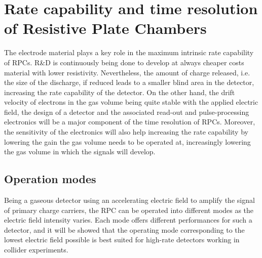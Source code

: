 \section{Rate capability and time resolution of Resistive Plate Chambers}
\label{chapt4:sec:RateCapa}

	The electrode material plays a key role in the maximum intrinsic rate capability of RPCs. R\&D is continuously being done to develop at always cheaper costs material with lower resistivity. Nevertheless, the amount of charge released, i.e. the size of the discharge, if reduced leads to a smaller blind area in the detector, increasing the rate capability of the detector. On the other hand, the drift velocity of electrons in the gas volume being quite stable with the applied electric field, the design of a detector and the associated read-out and pulse-processing electronics will be a major component of the time resolution of RPCs. Moreover, the sensitivity of the electronics will also help increasing the rate capability by lowering the gain the gas volume needs to be operated at, increasingly lowering the gas volume in which the signals will develop.
	
	\subsection{Operation modes}
	\label{chapt4:ssec:operation}
	
	Being a gaseous detector using an accelerating electric field to amplify the signal of primary charge carriers, the RPC can be operated into different modes as the electric field intensity varies. Each mode offers different performances for such a detector, and it will be showed that the operating mode corresponding to the lowest electric field possible is best suited for high-rate detectors working in collider experiments.
	
